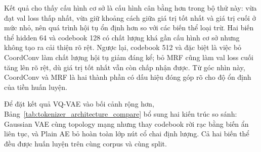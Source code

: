\documentclass[oneside,a4paper,12pt]{extreport}
\begin{document}
\begin{table}[H]
\centering
\small
\setlength{\tabcolsep}{4pt}
\renewcommand{\arraystretch}{1.08}
\caption{So sánh sáu cấu hình VQ-VAE trên cùng lịch huấn luyện 300 epoch}
\label{tab:vqvae_ablation_results}
\end{table}

Kết quả cho thấy cấu hình cơ sở là cấu hình cân bằng hơn trong bộ thử này: vừa đạt val loss thấp nhất, vừa giữ khoảng cách giữa giá trị tốt nhất và giá trị cuối ở mức nhỏ, nên quá trình hội tụ ổn định hơn so với các biến thể loại trừ. Hai biến thể hidden 64 và codebook 128 có chất lượng khá gần cấu hình cơ sở nhưng không tạo ra cải thiện rõ rệt. Ngược lại, codebook 512 và đặc biệt là việc bỏ CoordConv làm chất lượng hội tụ giảm đáng kể; bỏ MRF cũng làm val loss cuối tăng lên rõ rệt, dù giá trị tốt nhất vẫn còn chấp nhận được. Từ góc nhìn này, CoordConv và MRF là hai thành phần có dấu hiệu đóng góp rõ cho độ ổn định của tiền huấn luyện.

Để đặt kết quả VQ-VAE vào bối cảnh rộng hơn, Bảng~\ref{tab:tokenizer_architecture_compare} bổ sung hai kiến trúc so sánh: Gaussian VAE cùng topology mạng nhưng thay codebook rời rạc bằng biến ẩn liên tục, và Plain AE bỏ hoàn toàn lớp nút cổ chai định lượng. Cả hai biến thể đều được huấn luyện trên cùng corpus và cùng split.
\end{document}
